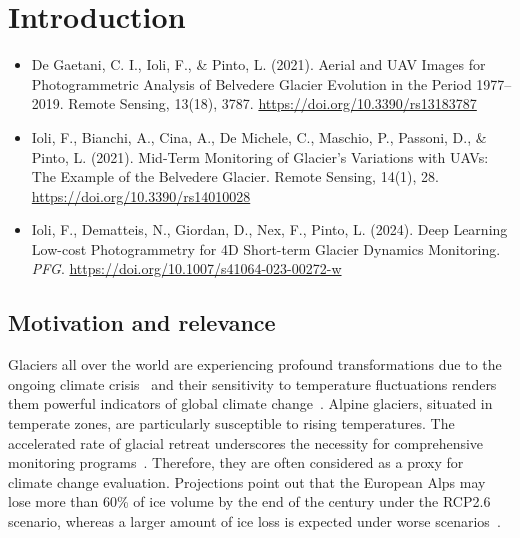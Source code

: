 \graphicspath{{figures/chapter1/}}
\onehalfspacing

\chapter{Introduction}\label{ch:introduction}

\vfill


\noindent 

\begin{itemize}
    \item De Gaetani, C. I., Ioli, F., \& Pinto, L. (2021). Aerial and UAV Images for Photogrammetric Analysis of Belvedere Glacier Evolution in the Period 1977–2019. Remote Sensing, 13(18), 3787. \url{https://doi.org/10.3390/rs13183787}
    \item Ioli, F., Bianchi, A., Cina, A., De Michele, C., Maschio, P., Passoni, D., \& Pinto, L. (2021). Mid-Term Monitoring of Glacier’s Variations with UAVs: The Example of the Belvedere Glacier. Remote Sensing, 14(1), 28. \url{https://doi.org/10.3390/rs14010028}
    \item Ioli, F., Dematteis, N., Giordan, D., Nex, F., Pinto, L. (2024). Deep Learning Low-cost Photogrammetry for 4D Short-term Glacier Dynamics Monitoring. \textit{PFG}. \url{https://doi.org/10.1007/s41064-023-00272-w}
\end{itemize}

\newpage

\section{Motivation and relevance}

Glaciers all over the world are experiencing profound transformations due to the ongoing climate crisis~\citep{Oerlemans2005} and their sensitivity to temperature fluctuations renders them powerful indicators of global climate change~\citep{Barry2016}.
Alpine glaciers, situated in temperate zones, are particularly susceptible to rising temperatures. The accelerated rate of glacial retreat underscores the necessity for comprehensive monitoring programs~\citep{Zemp2006,Sommer2020}. 
Therefore, they are often considered as a proxy for climate change evaluation.
Projections point out that the European Alps may lose more than 60\% of ice volume by the end of the century under the RCP2.6 scenario, whereas a larger amount of ice loss is expected under worse scenarios~\citep{Zekollari2019}.

